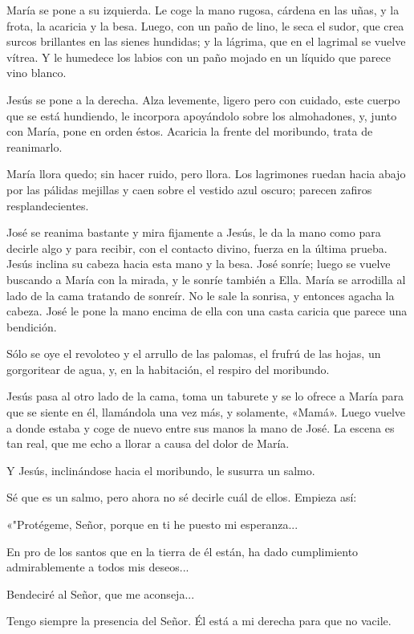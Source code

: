 \documentclass[12pt, twoside, openright]{book} %
\begin{document}
María se pone a su izquierda. Le coge la mano rugosa, cárdena en las uñas, y la frota, la acaricia y la besa. Luego, con un paño de lino, le seca el sudor, que crea surcos brillantes en las sienes hundidas; y la lágrima, que en el lagrimal se vuelve vítrea. Y le humedece los labios con un paño mojado en un líquido que parece vino blanco. 

Jesús se pone a la derecha. Alza levemente, ligero pero con cuidado, este cuerpo que se está hundiendo, le incorpora apoyándolo sobre los almohadones, y, junto con María, pone en orden éstos. Acaricia la frente del moribundo, trata de reanimarlo. 

María llora quedo; sin hacer ruido, pero llora. Los lagrimones ruedan hacia abajo por las pálidas mejillas y caen sobre el vestido azul oscuro; parecen zafiros resplandecientes. 

José se reanima bastante y mira fijamente a Jesús, le da la mano como para decirle algo y para recibir, con el contacto divino, fuerza en la última prueba. Jesús inclina su cabeza hacia esta mano y la besa. José sonríe; luego se vuelve buscando a María con la mirada, y le sonríe también a Ella. María se arrodilla al lado de la cama tratando de sonreír. No le sale la sonrisa, y entonces agacha la cabeza. José le pone la mano encima de ella con una casta caricia que parece una bendición. 

Sólo se oye el revoloteo y el arrullo de las palomas, el frufrú de las hojas, un gorgoritear de agua, y, en la habitación, el respiro del moribundo. 

Jesús pasa al otro lado de la cama, toma un taburete y se lo ofrece a María para que se siente en él, llamándola una vez más, y solamente, «Mamá». Luego vuelve a donde estaba y coge de nuevo entre sus manos la mano de José. La escena es tan real, que me echo a llorar a causa del dolor de María. 

Y Jesús, inclinándose hacia el moribundo, le susurra un salmo. 

Sé que es un salmo, pero ahora no sé decirle cuál de ellos. Empieza así: 

«"Protégeme, Señor, porque en ti he puesto mi esperanza... 

En pro de los santos que en la tierra de él están, ha dado cumplimiento admirablemente a todos mis deseos... 

Bendeciré al Señor, que me aconseja... 

Tengo siempre la presencia del Señor. Él está a mi derecha para que no vacile. 
\end{document}
